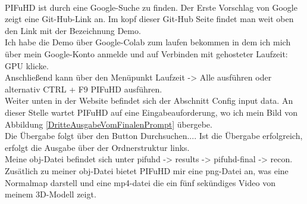 \documentclass[10pt,a4paper,bibliography=totocnumbered,listof=totocnumbered]{scrartcl}
\begin{document}
\\
PIFuHD ist durch eine Google-Suche zu finden. Der Erste Vorschlag von Google zeigt eine Git-Hub-Link an. Im kopf dieser Git-Hub Seite findet man weit oben den Link mit der Bezeichnung Demo.
\\
Ich habe die Demo über Google-Colab zum laufen bekommen in dem ich mich über mein Google-Konto anmelde und auf Verbinden mit gehosteter Laufzeit: GPU klicke.
\\
Anschließend kann über den Menüpunkt Laufzeit -> Alle ausführen oder alternativ CTRL + F9 PIFuHD ausführen.
\\
Weiter unten in der Website befindet sich der Abschnitt Config input data. An dieser Stelle wartet PIFuHD auf eine Eingabeauforderung, wo ich mein Bild von Abbildung \ref{DritteAusgabeVomFinalenPrompt} übergebe.
\\
Die Übergabe folgt über den Button Durchsuchen.... Ist die Übergabe erfolgreich, erfolgt die Ausgabe über der Ordnerstruktur links.
\\
Meine obj-Datei befindet sich unter pifuhd -> results -> pifuhd-final -> recon. Zusätlich zu meiner obj-Datei bietet PIFuHD mir eine png-Datei an, was eine Normalmap darstell und eine mp4-datei die ein fünf sekündiges Video von meinem 3D-Modell zeigt.
\\

\end{document}
